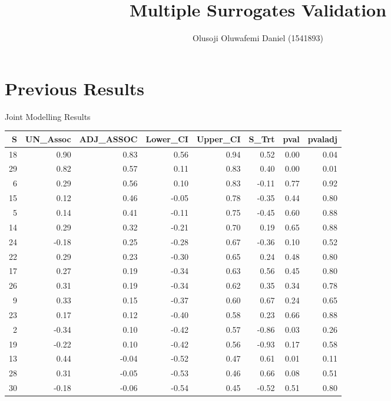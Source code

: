 \documentclass[a4paper,9pt]{beamer}\usepackage[]{graphicx}\usepackage[]{color}
\title{Multiple Surrogates Validation}
\author{Olusoji Oluwafemi Daniel (1541893)}
\institute{Hasselt University, Belgium}
\begin{document}
\frame{\maketitle}

\section{Previous Results}

\begin{frame}{Joint Modelling Results}
\tiny
\begin{table}[H]
\centering
\begin{tabular}{rrrrrrrr}
  \hline
S & UN\_Assoc & ADJ\_ASSOC & Lower\_CI & Upper\_CI & S\_Trt & pval & pvaladj \\ 
  \hline
 \alert{18} & 0.90 & 0.83 & 0.56 & 0.94 & 0.52 & 0.00 & 0.04 \\ 
  \alert{29} & 0.82 & 0.57 & 0.11 & 0.83 & 0.40 & 0.00 & 0.01 \\ 
    \alert{6} & 0.29 & 0.56 & 0.10 & 0.83 & -0.11 & 0.77 & 0.92 \\ 
   \alert{15} & 0.12 & 0.46 & -0.05 & 0.78 & -0.35 & 0.44 & 0.80 \\ 
    \alert{5} & 0.14 & 0.41 & -0.11 & 0.75 & -0.45 & 0.60 & 0.88 \\ 
   \alert{14} & 0.29 & 0.32 & -0.21 & 0.70 & 0.19 & 0.65 & 0.88 \\ 
   \alert{24} & -0.18 & 0.25 & -0.28 & 0.67 & -0.36 & 0.10 & 0.52 \\ 
   \alert{22} & 0.29 & 0.23 & -0.30 & 0.65 & 0.24 & 0.48 & 0.80 \\ 
   \alert{17} & 0.27 & 0.19 & -0.34 & 0.63 & 0.56 & 0.45 & 0.80 \\ 
   \alert{26} & 0.31 & 0.19 & -0.34 & 0.62 & 0.35 & 0.34 & 0.78 \\ 
    9 & 0.33 & 0.15 & -0.37 & 0.60 & 0.67 & 0.24 & 0.65 \\ 
   23 & 0.17 & 0.12 & -0.40 & 0.58 & 0.23 & 0.66 & 0.88 \\ 
    2 & -0.34 & 0.10 & -0.42 & 0.57 & -0.86 & 0.03 & 0.26 \\ 
   19 & -0.22 & 0.10 & -0.42 & 0.56 & -0.93 & 0.17 & 0.58 \\ 
   13 & 0.44 & -0.04 & -0.52 & 0.47 & 0.61 & 0.01 & 0.11 \\ 
   28 & 0.31 & -0.05 & -0.53 & 0.46 & 0.66 & 0.08 & 0.51 \\ 
   30 & -0.18 & -0.06 & -0.54 & 0.45 & -0.52 & 0.51 & 0.80 \\ 

\end{tabular}
\end{table}
\end{frame}
\end{document}
